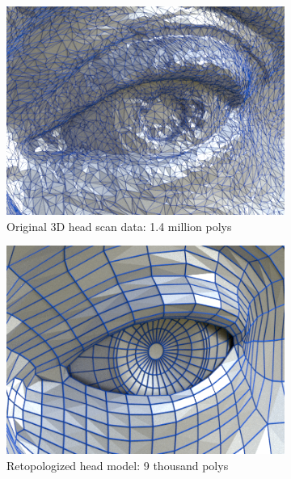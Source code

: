 \begin{figure}
    \centering
    \begin{subfigure}[t]{0.195\textwidth}
        \includegraphics[width=\textwidth]{process_f02_01}
        \caption{Original 3D head scan data: 1.4 million polys}
        \label{fig:process_original_scan}
    \end{subfigure}
    \hfill
    \begin{subfigure}[t]{0.195\textwidth}
        \includegraphics[width=\textwidth]{process_f02_02}
        \caption{Retopologized head model: 9 thousand polys}
        \label{fig:process_retopo}
    \end{subfigure}
    \hfill
    \begin{subfigure}[t]{0.195\textwidth}

\end{subfigure}
\end{figure}
